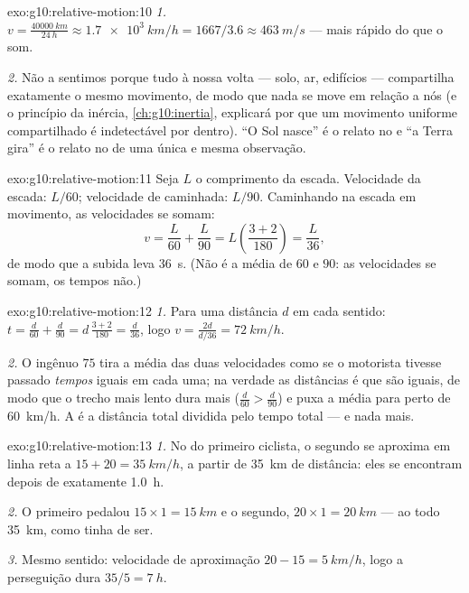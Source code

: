 \begin{solution}{exo:g10:relative-motion:10}
\emph{1.} $v = \frac{\qty{40000}{km}}{\qty{24}{h}}
\approx \qty{1.7e3}{km/h} = 1667/3.6 \approx \qty{463}{m/s}$ --- mais
rápido do que o som.

\emph{2.} Não a sentimos porque tudo à nossa volta --- solo, ar,
edifícios --- compartilha exatamente o mesmo movimento, de modo que nada
se move em relação a nós (e o princípio da inércia,
\cref{ch:g10:inertia}, explicará por que um movimento uniforme
compartilhado é indetectável por dentro). ``O Sol nasce'' é o relato no
 e ``a Terra gira'' é o relato no  de uma única e mesma observação.
\end{solution}

\begin{solution}{exo:g10:relative-motion:11}
Seja $L$ o comprimento da escada. Velocidade da escada: $L/60$;
velocidade de caminhada: $L/90$. Caminhando na escada em movimento, as
velocidades se somam:
\[
v = \frac{L}{60} + \frac{L}{90} = L\left(\frac{3 + 2}{180}\right)
= \frac{L}{36},
\]
de modo que a subida leva \qty{36}{s}. (Não é a média de $60$ e $90$: as
velocidades se somam, os tempos não.)
\end{solution}

\begin{solution}{exo:g10:relative-motion:12}
\emph{1.} Para uma distância $d$ em cada sentido:
$t = \frac{d}{60} + \frac{d}{90} = d\,\frac{3 + 2}{180} = \frac{d}{36}$,
logo $v = \frac{2d}{d/36} = \qty{72}{km/h}$.

\emph{2.} O ingênuo $75$ tira a média das duas velocidades como se o
motorista tivesse passado \emph{tempos} iguais em cada uma; na verdade as
distâncias é que são iguais, de modo que o trecho mais lento dura mais
($\frac{d}{60} > \frac{d}{90}$) e puxa a média para perto de
\qty{60}{km/h}. A  é a distância total dividida pelo
tempo total --- e nada mais.
\end{solution}

\begin{solution}{exo:g10:relative-motion:13}
\emph{1.} No  do primeiro ciclista, o segundo se aproxima em
linha reta a $15 + 20 = \qty{35}{km/h}$, a partir de \qty{35}{km} de
distância: eles se encontram depois de exatamente \qty{1.0}{h}.

\emph{2.} O primeiro pedalou $15 \times 1 = \qty{15}{km}$ e o segundo,
$20 \times 1 = \qty{20}{km}$ --- ao todo \qty{35}{km}, como tinha de ser.

\emph{3.} Mesmo sentido: velocidade de aproximação
$20 - 15 = \qty{5}{km/h}$, logo a perseguição dura
$35/5 = \qty{7}{h}$.
\end{solution}

